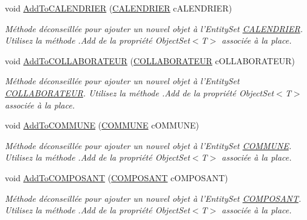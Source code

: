 \begin{DoxyCompactItemize}
void \hyperlink{class_model_1_1_b_d_d___s_i_o7_entities_abf7d4c9ded0275437ebc16bc8ab3209b}{Add\-To\-C\-A\-L\-E\-N\-D\-R\-I\-E\-R} (\hyperlink{class_model_1_1_c_a_l_e_n_d_r_i_e_r}{C\-A\-L\-E\-N\-D\-R\-I\-E\-R} c\-A\-L\-E\-N\-D\-R\-I\-E\-R)
\begin{DoxyCompactList}\small\item\em Méthode déconseillée pour ajouter un nouvel objet à l'Entity\-Set \hyperlink{class_model_1_1_c_a_l_e_n_d_r_i_e_r}{C\-A\-L\-E\-N\-D\-R\-I\-E\-R}. Utilisez la méthode .Add de la propriété Object\-Set$<$T$>$ associée à la place. \end{DoxyCompactList}\item 
void \hyperlink{class_model_1_1_b_d_d___s_i_o7_entities_af367e2be722776185ac6d88229412936}{Add\-To\-C\-O\-L\-L\-A\-B\-O\-R\-A\-T\-E\-U\-R} (\hyperlink{class_model_1_1_c_o_l_l_a_b_o_r_a_t_e_u_r}{C\-O\-L\-L\-A\-B\-O\-R\-A\-T\-E\-U\-R} c\-O\-L\-L\-A\-B\-O\-R\-A\-T\-E\-U\-R)
\begin{DoxyCompactList}\small\item\em Méthode déconseillée pour ajouter un nouvel objet à l'Entity\-Set \hyperlink{class_model_1_1_c_o_l_l_a_b_o_r_a_t_e_u_r}{C\-O\-L\-L\-A\-B\-O\-R\-A\-T\-E\-U\-R}. Utilisez la méthode .Add de la propriété Object\-Set$<$T$>$ associée à la place. \end{DoxyCompactList}\item 
void \hyperlink{class_model_1_1_b_d_d___s_i_o7_entities_adb90d0998ce774a09ed413ec2302dda0}{Add\-To\-C\-O\-M\-M\-U\-N\-E} (\hyperlink{class_model_1_1_c_o_m_m_u_n_e}{C\-O\-M\-M\-U\-N\-E} c\-O\-M\-M\-U\-N\-E)
\begin{DoxyCompactList}\small\item\em Méthode déconseillée pour ajouter un nouvel objet à l'Entity\-Set \hyperlink{class_model_1_1_c_o_m_m_u_n_e}{C\-O\-M\-M\-U\-N\-E}. Utilisez la méthode .Add de la propriété Object\-Set$<$T$>$ associée à la place. \end{DoxyCompactList}\item 
void \hyperlink{class_model_1_1_b_d_d___s_i_o7_entities_acebebfec4025e3aa4d4b84cce87eb7f2}{Add\-To\-C\-O\-M\-P\-O\-S\-A\-N\-T} (\hyperlink{class_model_1_1_c_o_m_p_o_s_a_n_t}{C\-O\-M\-P\-O\-S\-A\-N\-T} c\-O\-M\-P\-O\-S\-A\-N\-T)
\begin{DoxyCompactList}\small\item\em Méthode déconseillée pour ajouter un nouvel objet à l'Entity\-Set \hyperlink{class_model_1_1_c_o_m_p_o_s_a_n_t}{C\-O\-M\-P\-O\-S\-A\-N\-T}. Utilisez la méthode .Add de la propriété Object\-Set$<$T$>$ associée à la place. \end{DoxyCompactList}\item 

\end{DoxyCompactItemize}
